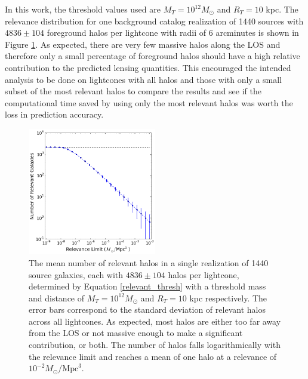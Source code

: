 \documentclass[%
 reprint,
 amsmath,amssymb,
 aps,nofootinbib
]{revtex4-1}
\begin{document}
In this work, the threshold values used are ${M_T=10^{12}M_\odot}$ and ${R_T=10}$ kpc. The relevance distribution for one background catalog realization of 1440 sources with ${4836\pm104}$ foreground halos per lightcone with radii of 6 arcminutes is shown in Figure \ref{fig:rel_dist}. As expected, there are very few massive halos along the LOS and therefore only a small percentage of foreground halos should have a high relative contribution to the predicted lensing quantities. This encouraged the intended analysis to be done on lightcones with all halos and those with only a small subset of the most relevant halos to compare the results and see if the computational time saved by using only the most relevant halos was worth the loss in prediction accuracy.

\begin{figure}
    \centering
    \includegraphics[width=0.5\textwidth]{figs-swe/thesis/relevance_distribution.png}
    \captionsetup{justification=raggedright,singlelinecheck=false}
    \caption{The mean number of relevant halos in a single realization of 1440 source galaxies, each with ${4836\pm104}$ halos per lightcone, determined by Equation \eqref{relevant_thresh} with a threshold mass and distance of ${M_T=10^{12}M_\odot}$ and ${R_T=10}$ kpc respectively. The error bars correspond to the standard deviation of relevant halos across all lightcones. As expected, most halos are either too far away from the LOS or not massive enough to make a significant contribution, or both. The number of halos falls logarithmically with the relevance limit and reaches a mean of one halo at a relevance of ${10^{-2}M_\odot/\text{Mpc}^3}$.}
    \label{fig:rel_dist}
\end{figure}
\end{document}
